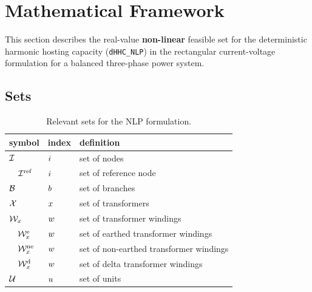 \documentclass[journal]{IEEEtran}
\begin{document}
\section{Mathematical Framework}
\label{sec:mathematical_framework}

This section describes the real-value \textbf{non-linear} feasible set for the deterministic harmonic hosting capacity (\texttt{dHHC\_NLP}) in the rectangular current-voltage formulation for a balanced three-phase power system. 

\subsection{Sets}

\begin{table}[H]
    \centering
    \caption{Relevant sets for the NLP formulation.}
    \label{tab:sets_nlp}
    \begin{tabular}{l l l }
        symbol                                  & index         & definition                                                \\ \hline
        $\mathcal{I}$                              & $i$       & set of nodes                                              \\
        $\quad \mathcal{I}^{\text{ref}}$                     & $i$       & set of reference node                                     \\ 
        $\mathcal{B}$                              & $b$       & set of branches                                           \\ 
        $\mathcal{X}$                              & $x$       & set of transformers                                       \\ 
        $\mathcal{W}_{x}$                   & $w$    & set of transformer windings                               \\
        $\quad \mathcal{W}^{\text{e}}_{x}$  & $w$    & set of earthed transformer windings                       \\
        $\quad \mathcal{W}^{\text{ne}}_{x}$ & $w$    & set of non-earthed transformer windings                   \\
        $\quad \mathcal{W}^{\text{d}}_{x}$  & $w$    & set of delta transformer windings                         \\
        $\mathcal{U}$                              & $u$       & set of units                                              \\

\end{tabular}
\end{table}
\end{document}

